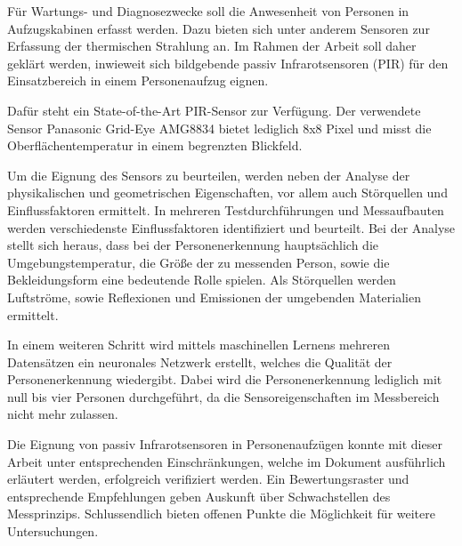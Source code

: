 Für Wartungs- und Diagnosezwecke soll die Anwesenheit von Personen in Aufzugskabinen erfasst werden. Dazu bieten sich unter anderem Sensoren zur Erfassung der thermischen Strahlung an. Im Rahmen der Arbeit soll daher geklärt werden, inwieweit sich bildgebende passiv Infrarotsensoren (PIR) für den Einsatzbereich in einem Personenaufzug eignen. 

Dafür steht ein State-of-the-Art PIR-Sensor zur Verfügung. Der verwendete Sensor Panasonic Grid-Eye AMG8834 bietet lediglich 8x8 Pixel und misst die Oberflächentemperatur in einem begrenzten Blickfeld.  

Um die Eignung des Sensors zu beurteilen, werden neben der Analyse der physikalischen und geometrischen Eigenschaften, vor allem auch Störquellen und Einflussfaktoren ermittelt. In mehreren Testdurchführungen und Messaufbauten werden verschiedenste Einflussfaktoren identifiziert und beurteilt. Bei der Analyse stellt sich heraus, dass bei der Personenerkennung hauptsächlich die Umgebungstemperatur, die Größe der zu messenden Person, sowie die Bekleidungsform eine bedeutende Rolle spielen. Als Störquellen werden Luftströme, sowie Reflexionen und Emissionen der umgebenden Materialien ermittelt.  

In einem weiteren Schritt wird mittels maschinellen Lernens mehreren Datensätzen ein neuronales Netzwerk erstellt, welches die Qualität der Personenerkennung wiedergibt. Dabei wird die Personenerkennung lediglich mit null bis vier Personen durchgeführt, da die Sensoreigenschaften im Messbereich nicht mehr zulassen. 

Die Eignung von passiv Infrarotsensoren in Personenaufzügen konnte mit dieser Arbeit unter entsprechenden Einschränkungen, welche im Dokument ausführlich erläutert werden, erfolgreich verifiziert werden.
Ein Bewertungsraster und entsprechende Empfehlungen geben Auskunft über Schwachstellen des Messprinzips. Schlussendlich bieten offenen Punkte die Möglichkeit für weitere Untersuchungen.   



